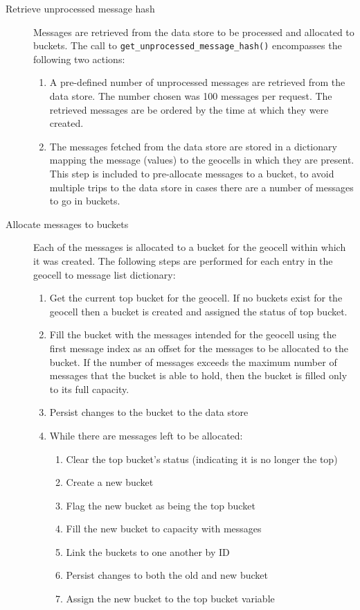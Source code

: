 \documentclass{article}
\begin{document}
\begin{description}
	\item[Retrieve unprocessed message hash] {Messages are retrieved from the data store to be processed and allocated to buckets. The call to \texttt{get\_unprocessed\_message\_hash()} encompasses the following two actions:

	\begin{enumerate}
		\item A pre-defined number of unprocessed messages are retrieved from the data store. The number chosen was 100 messages per request. The retrieved messages are be ordered by the time at which they were created.
		\item The messages fetched from the data store are stored in a dictionary mapping the message (values) to the geocells in which they are present. This step is included to pre-allocate messages to a bucket, to avoid multiple trips to the data store in cases there are a number of messages to go in buckets.
	\end{enumerate}}
	
	\item[Allocate messages to buckets] Each of the messages is allocated to a bucket for the geocell within which it was created. The following steps are performed for each entry in the geocell to message list dictionary:
	
	\begin{enumerate}
		\item Get the current top bucket for the geocell. If no buckets exist for the geocell then a bucket is created and assigned the status of top bucket.
		\item Fill the bucket with the messages intended for the geocell using the first message index as an offset for the messages to be allocated to the bucket. If the number of messages exceeds the maximum number of messages that the bucket is able to hold, then the bucket is filled only to its full capacity.
		\item Persist changes to the bucket to the data store
		
		\item
		{
			While there are messages left to be allocated:
			
			\begin{enumerate}
				\item Clear the top bucket's status (indicating it is no longer the top)
				\item Create a new bucket
				\item Flag the new bucket as being the top bucket
				\item Fill the new bucket to capacity with messages
				\item Link the buckets to one another by ID 
				\item Persist changes to both the old and new bucket
				\item Assign the new bucket to the top bucket variable
			\end{enumerate}
		}
	\end{enumerate}

\end{description}
\end{document}
